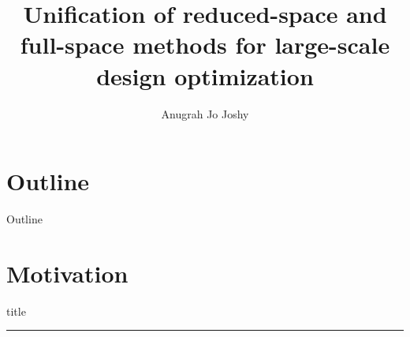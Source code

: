 \documentclass{beamer}
\title{Unification of reduced-space and full-space methods
for large-scale design optimization}
\author{Anugrah Jo Joshy}
\institute{University of California San Diego}
\date{} %
\begin{document}
{ 
\frame{\titlepage}}

\section*{Outline}\begin{frame}{Outline}\tableofcontents\end{frame}

\section{Motivation}
  \begin{frame}[plain]
      \vfill
    \centering
    \begin{beamercolorbox}[sep=8pt,center,shadow=true,rounded=true]{title}
      \insertsectionhead\par%
      \color{oxfordblue}\noindent\rule{10cm}{1pt} \\
      \LARGE{\faFileTextO}
    \end{beamercolorbox}
    \vfill
  \end{frame}

\begingroup
\small
\end{document}
